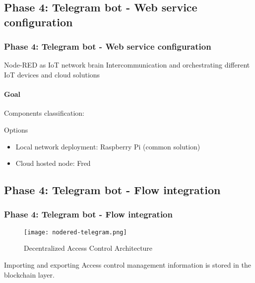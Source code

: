 \documentclass[
    aspectratio=169,                   %
]{beamer}
\begin{document}
\subsection{Phase 4: Telegram bot - Web service configuration}

    \begin{frame}
        \frametitle{Phase 4: Telegram bot - Web service configuration}

        \begin{block}{Node-RED as IoT network brain}
            Intercommunication and orchestrating different IoT devices and cloud solutions
        \end{block}

        \paragraph{Goal} Components classification:

        \begin{block}{Options}
            \begin{itemize}
                \item \alert{Local network deployment}: Raspberry Pi (common solution)
                \item \alert{Cloud hosted node}: Fred
            \end{itemize}
        \end{block}

    \end{frame}

\subsection{Phase 4: Telegram bot - Flow integration}

    \begin{frame}
     \frametitle{Phase 4: Telegram bot - Flow integration}
        \begin{figure}
            \centering
            \begin{stampbox}
                \texttt{[image: nodered-telegram.png]}
            \end{stampbox}
            \caption{Decentralized Access Control Architecture}
        \end{figure}

        \begin{block}{Importing and exporting}
            Access control management information is stored in the blockchain layer.
        \end{block}
    \end{frame}
\end{document}
